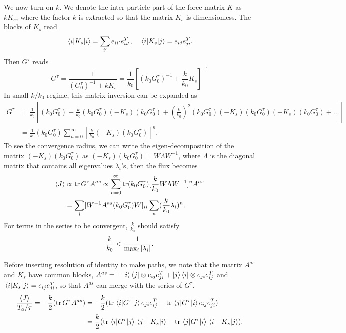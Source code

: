 \documentclass[
 amsmath,amssymb,
 aps,
 pre,
 longbibliography,
 10pt, onecolumn,
 notitlepage
]{revtex4-1}
\begin{document}
We now turn on $k$. We denote the inter-particle part of the force matrix $K$ as $k K_s$, where the factor $k$ is extracted so that the matrix $K_s$ is dimensionless. The blocks of $K_s$ read
\begin{equation} \label{eqnS:smallk_matKs}
    \mel{i}{K_s}{i} = \sum_{i'} e_{ii'}e_{ii'}^T, \quad
    \mel{i}{K_s}{j} = e_{ij}e_{ji}^T.
\end{equation}
Then $G^\tau$ reads
\begin{equation}
    G^\tau = \frac{1}{(G^\tau_0)^{-1} + k K_s}
    = \frac{1}{k_0} [(k_0 G^\tau_0)^{-1} + \frac{k}{k_0}K_s]^{-1}
\end{equation}
In small $k/k_0$ regime, this matrix inversion can be expanded as
\begin{equation} \label{eqnS:smallk_expand}
    \begin{split}
    G^\tau &= \frac{1}{k_0} [(k_0 G^\tau_0) + \frac{k}{k_0} (k_0 G^\tau_0) (-K_s) (k_0 G^\tau_0) + (\frac{k}{k_0})^2 (k_0 G^\tau_0) (-K_s) (k_0 G^\tau_0) (-K_s) (k_0 G^\tau_0) + \dots ]\\
    &= \frac{1}{k_0} (k_0 G^\tau_0) \sum_{n=0}^{\infty}[\frac{k}{k_0}(-K_s)(k_0 G^\tau_0)]^n.
    \end{split}
\end{equation}
To see the convergence radius, we can write the eigen-decomposition of the matrix $(-K_s)(k_0 G^\tau_0)$ as $(-K_s)(k_0 G^\tau_0) = W\Lambda W^{-1}$, where $\Lambda$ is the diagonal matrix that contains all eigenvalues $\lambda_i$'s, then the flux becomes
\begin{equation}
    \begin{split}
    \expval{J} &\propto \tr G^\tau A^{as}
    \propto \sum_{n=0}^{\infty}\tr (k_0 G^\tau_0) [\frac{k}{k_0}W\Lambda W^{-1}]^n A^{as} \\
    &= \sum_i [W^{-1} A^{as} (k_0 G^\tau_0) W]_{ii} \sum_n (\frac{k}{k_0} \lambda_i)^n.
    \end{split}
\end{equation}
For terms in the series to be convergent, $\frac{k}{k_0}$ should satisfy
\begin{equation} \label{eqnS:smallk_convergence}
    \frac{k}{k_0} < \frac{1}{\max_i\abs{\lambda_i}}.
\end{equation}

Before inserting resolution of identity to make paths, we note that the matrix $A^{as}$ and $K_s$ have common blocks, $A^{as} = -\ket{i}\bra{j} \otimes e_{ij}e_{ji}^T + \ket{j}\bra{i} \otimes e_{ji}e_{ij}^T$ and $\mel{i}{K_s}{j} = e_{ij}e_{ji}^T$, so that $A^{as}$ can merge with the series of $G^\tau$.
\begin{equation} \label{eqnS:smallk_J_block}
    \begin{split}
    \frac{\expval{J}}{T_a/\tau} = -\frac{k}{2} (\tr G^\tau A^{as})
    &= -\frac{k}{2} (\tr \mel{i}{G^\tau}{j} e_{ji}e_{ij}^T - \tr \mel{j}{G^\tau}{i} e_{ij}e_{ji}^T) \\
    &= \frac{k}{2} (\tr \mel{i}{G^\tau}{j} \mel{j}{-K_s}{i} - \tr \mel{j}{G^\tau}{i} \mel{i}{-K_s}{j}).
    \end{split}
\end{equation}
\end{document}
